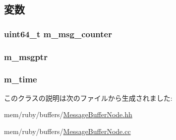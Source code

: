 \subsection{変数}
\hypertarget{classMessageBufferNode_a3d60a9aaa917e449f52162fd0e6d3f25}{
\subsubsection[{m\_\-msg\_\-counter}]{\setlength{\rightskip}{0pt plus 5cm}uint64\_\-t {\bf m\_\-msg\_\-counter}}}
\label{classMessageBufferNode_a3d60a9aaa917e449f52162fd0e6d3f25}
\hypertarget{classMessageBufferNode_a0190ebd96c557881596457a02c2f8743}{
\subsubsection[{m\_\-msgptr}]{ {\bf m\_\-msgptr}}}
\label{classMessageBufferNode_a0190ebd96c557881596457a02c2f8743}
\hypertarget{classMessageBufferNode_adb6d90850c7a231a52313b5bc7e5df68}{
\subsubsection[{m\_\-time}]{ {\bf m\_\-time}}}
\label{classMessageBufferNode_adb6d90850c7a231a52313b5bc7e5df68}


このクラスの説明は次のファイルから生成されました:\begin{DoxyCompactItemize}
\item 
mem/ruby/buffers/\hyperlink{MessageBufferNode_8hh}{MessageBufferNode.hh}\item 
mem/ruby/buffers/\hyperlink{MessageBufferNode_8cc}{MessageBufferNode.cc}\end{DoxyCompactItemize}

